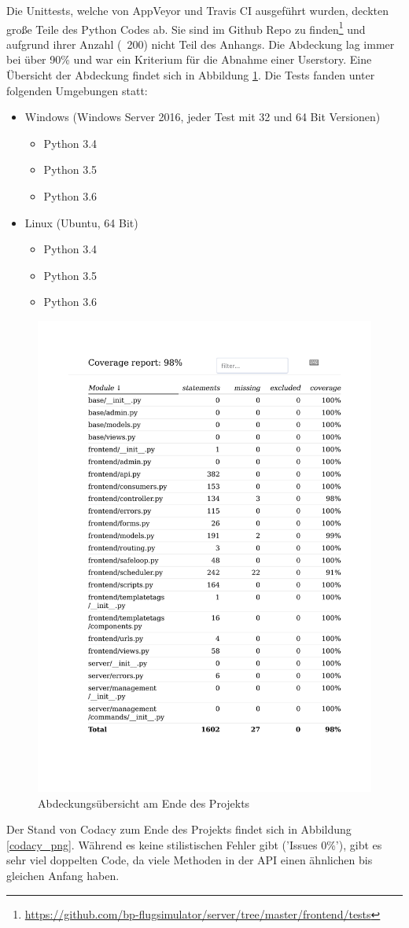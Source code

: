 Die Unittests, welche von AppVeyor und Travis CI ausgeführt wurden, deckten große Teile des Python Codes ab. Sie sind im Github Repo
zu finden\footnote{\url{https://github.com/bp-flugsimulator/server/tree/master/frontend/tests}} und aufgrund ihrer Anzahl (~200) nicht
Teil des Anhangs.
Die Abdeckung lag immer bei über 90\% und war ein Kriterium für die Abnahme einer Userstory. Eine Übersicht der Abdeckung
findet sich in Abbildung \ref{coverage_pdf}.
Die Tests fanden unter folgenden Umgebungen statt:
\begin{itemize}
	\item Windows (Windows Server 2016, jeder Test mit 32 und 64 Bit Versionen)
		\begin{itemize}
			\item Python 3.4
			\item Python 3.5
			\item Python 3.6
		\end{itemize}
	\item Linux (Ubuntu, 64 Bit)
		\begin{itemize}
			\item Python 3.4
			\item Python 3.5
			\item Python 3.6
		\end{itemize}
\end{itemize}
\begin{figure}[t]
	\centering
\includegraphics[width=.8\textwidth]{img/coverage.pdf}
	\caption{Abdeckungsübersicht am Ende des Projekts}
	\label{coverage_pdf}
\end{figure}
Der Stand von Codacy zum Ende des Projekts findet sich in Abbildung \ref{codacy_png}. Während
es keine stilistischen Fehler gibt ('Issues 0\%'), gibt es sehr viel doppelten Code, da viele Methoden
in der API einen ähnlichen bis gleichen Anfang haben.

